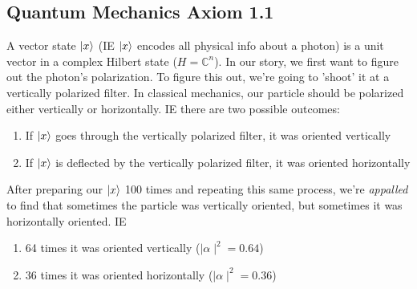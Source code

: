 \documentclass[12pt]{article}
\theoremstyle{plain}
\theoremstyle{nonumberplain}
\theoremstyle{plain}
\theoremstyle{nonumberplain}
\newcommand\1{{\bf 1}}
\newcommand{\C}{\mathbb{C}} %
\newcommand{\<}{\left\langle}
\renewcommand{\>}{\right\rangle}
\begin{document}

\subsection{Quantum Mechanics Axiom 1.1}
A vector state $\ket{x}$ (IE $\ket{x}$ encodes all physical info about a photon) is a unit vector in a complex Hilbert state ($H=\C^n$). In our story, we first want to figure out the photon's polarization. To figure this out, we're going to 'shoot' it at a vertically polarized filter. In classical mechanics, our particle should be polarized either vertically or horizontally. IE there are two possible outcomes:
\begin{enumerate}
\item If $\ket{x}$ goes through the vertically polarized filter, it was oriented vertically
\item If $\ket{x}$ is deflected by the vertically polarized filter, it was oriented horizontally
\end{enumerate}
After preparing our $\ket{x}$ 100 times and repeating this same process, we're \textit{appalled} to find that sometimes the particle was vertically oriented, but sometimes it was horizontally oriented. IE
\begin{enumerate}
\item 64 times it was oriented vertically ($\mid\alpha\mid^2=0.64$)
\item 36 times it was oriented horizontally ($\mid\alpha\mid^2=0.36$)
\end{enumerate}

\end{document}
